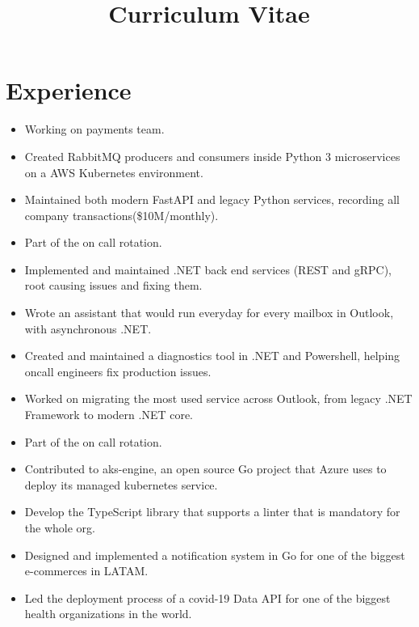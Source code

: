 \documentclass[10pt, a4paper, roman]{moderncv} %
\title{Curriculum Vitae}
\begin{document}
\makecvtitle %

\section{Experience}

{
    \begin{itemize}
        \item Working on payments team.
    \end{itemize}
}


{
    \begin{itemize}
        \item Created RabbitMQ producers and consumers inside Python 3 microservices on a AWS Kubernetes environment.
        \item Maintained both modern FastAPI and legacy Python services, recording all company transactions(\$10M/monthly).
        \item Part of the on call rotation.
    \end{itemize}
}

{
    \begin{itemize}
        \item Implemented and maintained .NET back end services (REST and gRPC), root causing issues and fixing them.
        \item Wrote an assistant that would run everyday for every mailbox in Outlook, with asynchronous .NET.
        \item Created and maintained a diagnostics tool in .NET and Powershell, helping oncall engineers fix production issues.
        \item Worked on migrating the most used service across Outlook, from legacy .NET Framework to modern .NET core.
        \item Part of the on call rotation.
    \end{itemize}
}

{
    \begin{itemize}
	    \item Contributed to aks-engine, an open source Go project that Azure uses to deploy its managed kubernetes service. 
	    \item Develop the TypeScript library that supports a linter that is mandatory for the whole org.
        \item Designed and implemented a notification system in Go for one of the biggest e-commerces in LATAM.
        \item Led the deployment process of a covid-19 Data API for one of the biggest health organizations in the world.
    \end{itemize}
}
\end{document}
